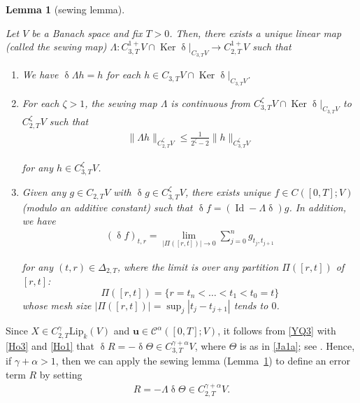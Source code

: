 \documentclass[letterpaper, 11pt,  reqno]{amsart}
\newtheorem{lemma}[theorem]{Lemma}
\DeclareMathOperator{\Id}{Id}
\DeclareMathOperator{\Ker}{Ker}
\newcommand{\1}{\hspace{0.5mm}\text{I}\hspace{0.5mm}}
\newcommand{\noi}{\noindent}
\newcommand{\CC}{\mathcal{C}}
\newcommand{\al}{\alpha}
\newcommand{\updl}{\updelta}
\newcommand{\Dl}{\Delta}
\newcommand{\g}{\gamma}
\newcommand{\Ld}{\Lambda}
\newcommand{\Lip}{\mathrm{Lip}}
\newcommand{\uu}{\mathbf{u}}
\newcommand{\z}{\zeta}
\newcommand{\Ta}{\Theta}
\numberwithin{equation}{section}
\numberwithin{theorem}{section}
\begin{document}
\begin{lemma}[sewing lemma]
\label{LEM:sew}


Let $V$ be a Banach space and 
fix $T>0$. 
Then,  there exists a unique linear map \textup{(}called the sewing map\textup{)}
$\Lambda:C^{1+}_{3,T} V \cap 
\Ker \updl|_{C_{3,T}V}
\to C^{1+}_{2,T}V$ such that 

\smallskip
\begin{enumerate}
\item[(i)] 
We have 
$\updl \Lambda h = h$
for each  $h\in C_{3,T}V\cap \Ker  \updl|_{C_{3,T} V}$.



\smallskip

\item[(ii)]
 For each $\z >1$,
the sewing map $\Lambda$ is continuous
from $C^\z _{3,T}V\cap 
\Ker  \updl|_{C_{3,T} V}$ to 
$C^\z _{2,T}V$ such that 
\begin{align*}
\|\Lambda h \|_{C^\z _{2,T}V} 
\le \frac{1}{2^\z - 2}  \| h \|_{C^\z _{3,T}V} 
\end{align*}


\noi
for any $h\in C^\z _{3,T}V$.



\smallskip
\item[(iii)] 
Given any  $g\in C_{2,T}V$ 
with 
$\updl g\in C^\z _{3,T}V$, 
 there exists  unique
$f\in C([0, T];V)$  \textup{(}modulo an additive  constant\textup{)} 
such that 
$\updl f = (\Id - \Lambda \updl)g$. 
In addition, 
we have 
\begin{align*}
(\updl f)_{t,r} = \lim_{|\Pi([r,t])|\to 0} 
\sum_{j=0}^n g_{t_j,t_{j+1}}
\end{align*}


\noi
 for any $(t,r)\in \Dl_{2,T}$,
 where 
 the limit is over any partition
 $\Pi([r,t])$  
 of  $[r,t]$\textup{:} 
\[\Pi ([r,t]) = \{r = t_n < \dots < t_1 <  t_0 = t\}\]
whose mesh size 
$|\Pi([r,t])| = \sup_{j} |t_j-t_{j+1}|$ 
tends to $0$.


\end{enumerate}


\end{lemma}







Since
$X\in C^\g_{2,T}\Lip_k(V)$
and 
$\uu\in \CC^{\al}([0,T];V)$, 
it follows from \eqref{YQ3} with \eqref{Ho3} and \eqref{Ho1} that 
$\updl R 
= -\updl \Ta 
 \in C^{\g + \al}_{3,T}V$, 
 where $\Ta$ is as in \eqref{Ja1a}; see \cite[(3.27)]{CGLLO1}.
Hence, if $\g + \al > 1$, 
then we can apply the sewing lemma (Lemma~\ref{LEM:sew})
to define an error term $R$ by setting
\begin{align}
R = - \Ld \updl  \Theta
\in C^{\g + \al}_{2,T}V.
\label{YQ4} 
\end{align}
\end{document}
